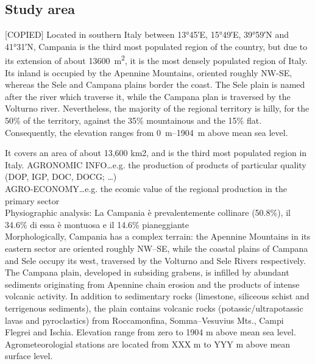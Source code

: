 \documentclass[authoryear,preprint,review,12pt]{elsarticle}
\begin{document}
\subsection{Study area}
[COPIED] Located in southern Italy between \ang{13;45;}E, \ang{15;49;}E, \ang{39;59;}N and \ang{41;31;}N, Campania is the third most populated region of the country, but due to its extension of about \SI{13600}{\metre\squared}, it is the most densely populated region of Italy.
Its inland is occupied by the Apennine Mountains, oriented roughly NW-SE, whereas the Sele and Campana plains border the coast.
The Sele plain is named after the river which traverse it, while the Campana plan is traversed by the Volturno river.
Nevertheless, the majority of the regional territory is hilly, for the 50\% of the territory, against the 35\% mountainous and the 15\% flat.
Consequently, the elevation ranges from \SIrange{0}{1904}{\metre} above mean sea level.

    It covers an area of about 13,600 km2, and is the third most populated region in Italy.
    AGRONOMIC INFO\dots e.g. the production of products of particular quality (DOP, IGP, DOC, DOCG; \dots)\\
    AGRO-ECONOMY\dots e.g. the ecomic value of the regional production in the primary sector\\
    Physiographic analysis: La Campania è prevalentemente collinare (50.8\%), il 34.6\% di essa è montuosa e il 14.6\% pianeggiante\\
    
    Morphologically, Campania has a complex terrain: the Apennine Mountains in its eastern sector are oriented roughly NW–SE, while the coastal plains of Campana and Sele occupy its west, traversed by the Volturno and Sele Rivers respectively.
    The Campana plain, developed in subsiding grabens, is infilled by abundant sediments originating from Apennine chain erosion and the products of intense volcanic activity.
    In addition to sedimentary rocks (limestone, siliceous schist and terrigenous sediments), the plain contains volcanic rocks (potassic/ultrapotassic lavas and pyroclastics) from Roccamonfina, Somma–Vesuvius Mts., Campi Flegrei and Ischia.
    Elevation range from zero to 1904 m above mean sea level.
    Agrometeorologial stations are located from XXX m to YYY m above mean surface level.
\end{document}
